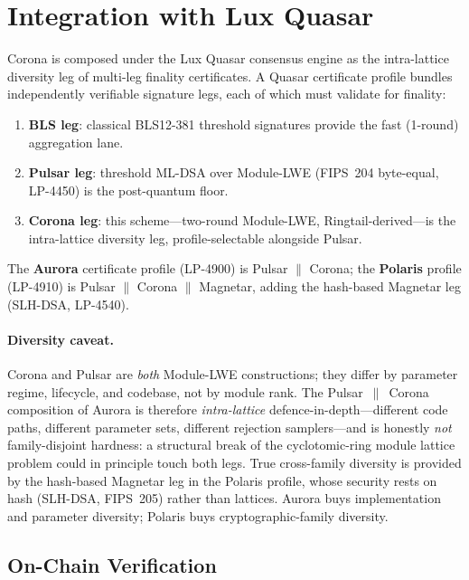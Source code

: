 \section{Integration with Lux Quasar}

\label{sec:integration}

Corona is composed under the Lux Quasar consensus engine as the intra-lattice diversity
leg of multi-leg finality certificates. A Quasar certificate profile bundles
independently verifiable signature legs, each of which must validate for finality:

\begin{enumerate}[nosep]
\item \textbf{BLS leg}: classical BLS12-381 threshold signatures provide the fast
(1-round) aggregation lane.
\item \textbf{Pulsar leg}: threshold ML-DSA over Module-LWE (FIPS~204 byte-equal,
LP-4450) is the post-quantum floor.
\item \textbf{Corona leg}: this scheme---two-round Module-LWE, Ringtail-derived---is the
intra-lattice diversity leg, profile-selectable alongside Pulsar.
\end{enumerate}

\noindent The \textbf{Aurora} certificate profile (LP-4900) is Pulsar $\|$ Corona; the
\textbf{Polaris} profile (LP-4910) is Pulsar $\|$ Corona $\|$ Magnetar, adding the
hash-based Magnetar leg (SLH-DSA, LP-4540).

\paragraph{Diversity caveat.}
Corona and Pulsar are \emph{both} Module-LWE constructions; they differ by parameter
regime, lifecycle, and codebase, not by module rank. The Pulsar~$\|$~Corona composition
of Aurora is therefore \emph{intra-lattice} defence-in-depth---different code paths,
different parameter sets, different rejection samplers---and is honestly \emph{not}
family-disjoint hardness: a structural break of the cyclotomic-ring module lattice
problem could in principle touch both legs. True cross-family diversity is provided by the
hash-based Magnetar leg in the Polaris profile, whose security rests on hash (SLH-DSA,
FIPS~205) rather than lattices. Aurora buys implementation and parameter diversity;
Polaris buys cryptographic-family diversity.

\subsection{On-Chain Verification}

